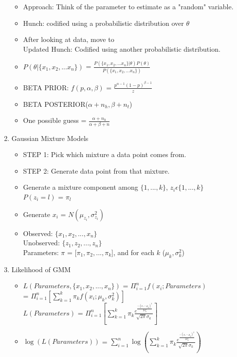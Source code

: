 \documentclass[a4paper]{article}
\begin{document}
\begin{enumerate}
\begin{itemize}
        \item Approach: Think of the parameter to estimate as a "random" variable.
        \item Hunch: codified using a probabilistic distribution over $\theta$
        \item After looking at data, move to\\
        Updated Hunch: Codified using another probabilistic distribution.
        \item $P(\theta | \{x_1,x_2,...x_n\})$ = $\frac{P(\{x_1,x_2,...x_n\} | \theta)P(\theta)}{P(\{x_1,x_2,...x_n\})}$
        \item BETA PRIOR: $f(p, \alpha, \beta)$ = $\frac{p^{\alpha-1}(1-p)^{\beta-1}}{z}$
        \item BETA POSTERIOR($\alpha+n_h,\beta+n_t$)
        \item One possible guess = $\frac{\alpha+n_h}{\alpha+\beta+n}$
    \end{itemize}
    \item Gaussian Mixture Models
    \begin{itemize}
        \item STEP 1: Pick which mixture a data point comes from.
        \item STEP 2: Generate data point from that mixture.
        \item Generate a mixture component among $\{1,...,k\}$, $z_i\epsilon\{1,...,k\}$\\
        $P(z_i=l)$ = $\pi_l$
        \item Generate $x_i$ = $N(\mu_{z_i}, \sigma^2_{z_i})$
        \item Observed: $\{x_1,x_2,...,x_n\}$\\
        Unobserved: $\{z_1,z_2,...,z_n\}$\\
        Parameters: $\pi$ = [$\pi_1,\pi_2,...,\pi_k$], and for each $k$ ($\mu_k, \sigma_k^2$)
    \end{itemize}
    \item Likelihood of GMM
    \begin{itemize}
        \item $L(Parameters,\{x_1,x_2,...,x_n\})$ = $\Pi_{i=1}^n f(x_i; Parameters)$\\
        = $\Pi_{i=1}^n [\sum_{k=1}^k \pi_k f(x_i;\mu_k, \sigma^2_k)]$\\
        $L(Parameters)$ = $\Pi_{i=1}^n [\sum_{k=1}^k\pi_k\frac{e^{\frac{-(x_i - \mu_k)^2}{2\sigma_k^2}}}{\sqrt{2\pi}\sigma_k}]$
        \item $\log(L(Parameters))$ = $\sum_{i=1}^n\log(\sum_{k=1}^k\pi_k\frac{e^{\frac{-(x_i - \mu_k)^2}{2\sigma_k^2}}}{\sqrt{2\pi}\sigma_k})$

\end{itemize}
\end{enumerate}
\end{document}
